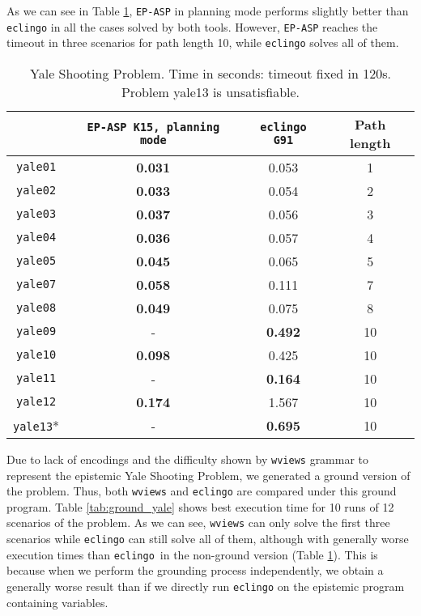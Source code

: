 \documentclass{new_tlp}
\def\eclingo{{\tt eclingo}}
\def\wviews{{\tt \wviews}}
\def\wviews{{\tt wviews}}
\def\EPASP{{\tt EP-ASP}}
\begin{document}
As we can see in Table \ref{tab:yale}, \EPASP{} in planning mode performs slightly better than \eclingo{} in all the cases solved by both tools. However, \EPASP{} reaches the timeout in three scenarios for path length 10, while \eclingo{} solves all of them.
\begin{table}[ht]
    \begin{tabular}{c|cc|c}
    \hline
           & \texttt{\EPASP{} K15, planning mode} & \texttt{eclingo G91} & Path length \\ \hline
    \texttt{yale01} & {\bf 0.031}      & 0.053       & 1       \\
    \texttt{yale02} & {\bf 0.033}      & 0.054       & 2       \\
    \texttt{yale03} & {\bf 0.037}      & 0.056       & 3       \\
    \texttt{yale04} & {\bf 0.036}      & 0.057       & 4       \\
    \texttt{yale05} & {\bf 0.045}      & 0.065       & 5       \\
    \texttt{yale07} & {\bf 0.058}      & 0.111       & 7       \\
    \texttt{yale08} & {\bf 0.049}      & 0.075       & 8       \\
    \texttt{yale09} & -          & {\bf 0.492}       & 10      \\
    \texttt{yale10} & {\bf 0.098}      & 0.425       & 10      \\
    \texttt{yale11} & -          & {\bf 0.164}       & 10      \\
    \texttt{yale12} & {\bf 0.174}      & 1.567       & 10      \\
    \texttt{yale13}* & -         & {\bf 0.695}      & 10      \\ \hline
    \end{tabular}
\caption{Yale Shooting Problem. Time in seconds: timeout fixed in 120s. Problem yale13 is unsatisfiable.}
\label{tab:yale}
\end{table}

Due to lack of encodings and the difficulty shown by \wviews{} grammar to represent the epistemic Yale Shooting Problem, we generated a ground version of the problem. Thus, both \wviews{} and \eclingo{} are compared under this ground program. Table \ref{tab:ground_yale} shows best execution time for 10 runs of 12 scenarios of the problem. As we can see, \wviews{} can only solve the first three scenarios while \eclingo{} can still solve all of them, although with generally worse execution times than \eclingo{} in the non-ground version (Table \ref{tab:yale}).
This is because when we perform the grounding process independently, we obtain a generally worse result than if we directly run \eclingo{} on the epistemic program containing variables.
\end{document}

